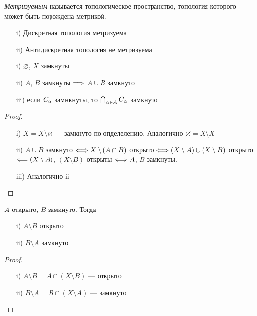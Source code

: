 \begin{definition}
    \textit{Метризуемым} называется топологическое пространство, топология
    которого может быть порождена метрикой.
\end{definition}

\begin{examples}
    \enewline
    \begin{itemize}
        \item[i)] Дискретная топология метризуема
        \item[ii)] Антидискретная топология не метризуема
    \end{itemize}
\end{examples}

\begin{theorem}
    \enewline
    \begin{itemize}
        \item[i)] $\varnothing$, $X$ замкнуты
        \item[ii)] $A$, $B$ замкнуты $\Longrightarrow$ $A \cup B$ замкнуто
        \item[iii)] если $C_\alpha$ замнкнуты, то $\bigcap_{\alpha \in A}{C_\alpha}$ замкнуто
    \end{itemize}
\end{theorem}
\begin{proof}
    \enewline
    \begin{itemize}
        \item[i)] $X = X \setminus \varnothing$ --- замкнуто по опделелению.
        Аналогично $\varnothing = X \setminus X$
        \item[ii)] $A \cup B$ замкнуто $\Longleftrightarrow X \setminus (A \cap B)$ открыто
        $\Longleftrightarrow (X \setminus A) \cup (X \setminus B)$ открыто $\Longleftarrow (X \setminus
        A)$, $(X \setminus B)$ открыты $\Longleftrightarrow A$, $B$ замкнуты.
        \item[iii)] Аналогично ii
    \end{itemize}
\end{proof}

\begin{theorem}
    $A$ открыто, $B$ замкнуто. Тогда

    \begin{itemize}
        \item[i)] $A \setminus B$ открыто
        \item[ii)] $B \setminus A$ замкнуто
    \end{itemize}
\end{theorem}
\begin{proof}
    \enewline
    \begin{itemize}
        \item[i)] $A \setminus B = A \cap (X \setminus B)$ --- открыто
        \item[ii)] $B \setminus A = B \cap (X \setminus A)$ --- замкнуто
    \end{itemize}
\end{proof}

